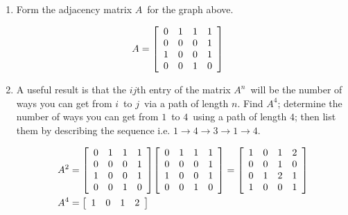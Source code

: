 \documentclass{letter}
\newcommand{\?}{\stackrel{?}{=}}
\newcommand\Que[1]{%
   \leavevmode\noindent
   #1
}
\newcommand\Ans[2][]{%
   \leavevmode\noindent
   {
       \begin{mdframed}[backgroundcolor=blue!10]
       #2
       \end{mdframed}
   }
}
\newenvironment{Mat}[1]{%
  \left[\begin{array}{*{#1}{r}}
}{%
  \end{array}\right]
}
\begin{document}
\begin{enumerate}
    \begin{enumerate}[label=(\alph*)]
    \item \Que{
        Form the adjacency matrix $A$\ for the graph above.
    }
    \Ans{
      \begin{align*}
         A &= \begin{Mat}{4} 0 & 1 & 1 & 1 \\
                             0 & 0 & 0 & 1 \\
                             1 & 0 & 0 & 1 \\
                             0 & 0 & 1 & 0 \end{Mat}
      \end{align*}
    }
    \item \Que{
        A useful result is that the $ij$th entry of the matrix $A^n$\ will be the number of ways you can get from $i$\ to $j$\ via a path
        of length $n$.  Find $A^4$; determine the number of ways you can get from $1$\ to $4$\ using a path of length $4$; then list them by describing the sequence i.e. $1\to 4\to 3\to 1\to 4$.
    }
    \Ans{
      \begin{align*}
        A^2 &=\begin{Mat}{4} 0 & 1 & 1 & 1 \\
                             0 & 0 & 0 & 1 \\
                             1 & 0 & 0 & 1 \\
                             0 & 0 & 1 & 0 
                             \end{Mat}
              \begin{Mat}{4} 0 & 1 & 1 & 1 \\
                             0 & 0 & 0 & 1 \\
                             1 & 0 & 0 & 1 \\
                             0 & 0 & 1 & 0 
                             \end{Mat}
             =\begin{Mat}{4} 1 & 0 & 1 & 2 \\
                             0 & 0 & 1 & 0 \\
                             0 & 1 & 2 & 1 \\
                             1 & 0 & 0 & 1 
                             \end{Mat}\\
         A^4 &=\begin{Mat}{4}1 & 0 & 1 & 2 \\

\end{Mat}
\end{align*}}
\end{enumerate}
\end{enumerate}
\end{document}
